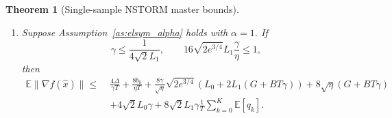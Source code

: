 \documentclass[letter,11pt]{article}
\newtheorem{theorem}{Theorem}[]
\newcommand{\E}{\mathbb{E}}
\begin{document}
\begin{theorem}[Single-sample NSTORM master bounds]
\begin{enumerate}[label=(\roman*), leftmargin=*]
\item Suppose Assumption~\ref{as:elsym_alpha} holds with \(\alpha=1\). If
\[
    \gamma\le \frac{1}{4\sqrt2L_1},
    \qquad
    16\sqrt{2e^{3/4}}L_1\frac{\gamma}{\eta}\le1,
\]
then
\begin{equation}
\label{eq:app_nstorm_master_one}
\begin{aligned}
    \E\|\nabla f(\widehat x)\|
    \le\;&
    \frac{4\Delta}{\gamma T}
    +
    \frac{8b_0}{\eta T}
    +
    \frac{8\gamma}{\sqrt\eta}
    \sqrt{2e^{3/4}}
    \left(
        L_0+2L_1(G+BT\gamma)
    \right)
    +
    8\sqrt\eta(G+BT\gamma)
    \\
    &+
    4\sqrt2L_0\gamma
    +
    8\sqrt2L_1\gamma
    \frac1T\sum_{k=0}^K\E[q_k].
\end{aligned}
\end{equation}
\end{enumerate}
\end{theorem}
\end{document}
